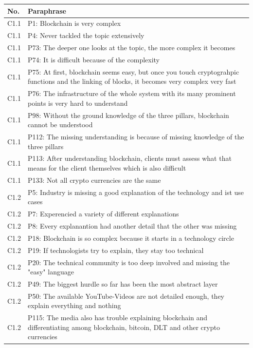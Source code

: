 \begin{table}[H]
    \centering
    \begin{tabularx}{\textwidth}{l|X}
	No. & Paraphrase \\\hline
	C1.1 & P1: Blockchain is very complex \\  
	C1.1 & P4: Never tackled the topic extensively \\  
	C1.1 & P73: The deeper one looks at the topic, the more complex it becomes \\  
	C1.1 & P74: It is difficult because of the complexity \\  
	C1.1 & P75: At first, blockchain seems easy, but once you touch cryptograhpic functions and the linking of blocks, it becomes very complex very fast \\  
	C1.1 & P76: The infrastructure of the whole system with its many prominent points is very hard to understand \\  
	C1.1 & P98: Without the ground knowledge of the three pillars, blockchain cannot be understood \\	C1.1 & P112: The missing understanding is because of missing knowledge of the three pillars \\	C1.1 & P113: After understanding blockchain, clients must assess what that means for the client themselves which is also difficult \\  
	C1.1 & P133: Not all crypto currencies are the same \\  \hline
	C1.2 & P5: Industry is missing a good explanation of the technology and ist use cases \\  
	C1.2 & P7: Experencied a variety of different explanations \\  
	C1.2 & P8: Every explanantion had another detail that the other was missing \\  
	C1.2 & P18: Blockchain is so complex because it starts in a technology circle \\  
	C1.2 & P19: If technologists try to explain, they stay too technical \\  
	C1.2 & P20: The technical community is too deep involved and missing the "easy" language \\  
	C1.2 & P49: The biggest hurdle so far has been the most abstract layer \\  
	C1.2 & P50: The available YouTube-Videos are not detailed enough, they explain everything and nothing \\ 
	C1.2 & P115: The media also has trouble explaining blockchain and differentiating among blockchain, bitcoin, DLT and other crypto currencies \\  

\end{tabularx}
\end{table}

